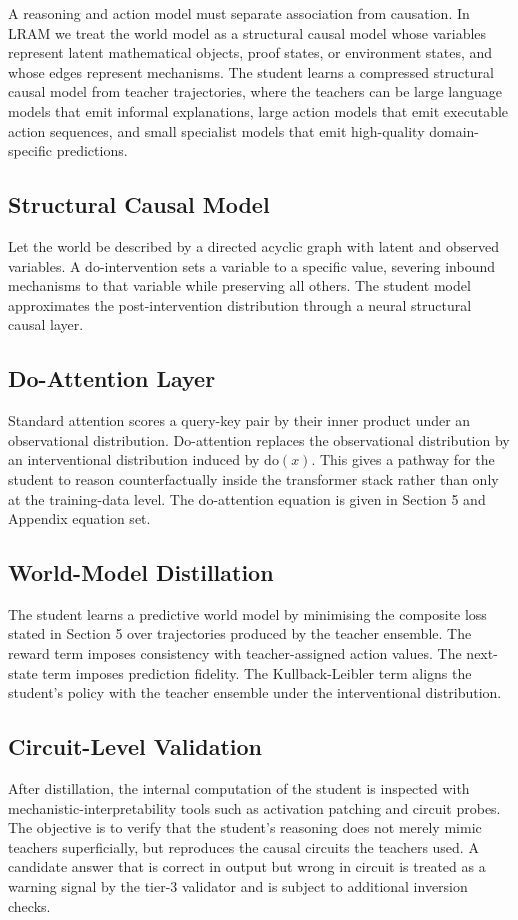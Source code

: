 A reasoning and action model must separate association from causation. In LRAM we treat the world model as a structural causal model whose variables represent latent mathematical objects, proof states, or environment states, and whose edges represent mechanisms. The student learns a compressed structural causal model from teacher trajectories, where the teachers can be large language models that emit informal explanations, large action models that emit executable action sequences, and small specialist models that emit high-quality domain-specific predictions.

\subsection{Structural Causal Model}
Let the world be described by a directed acyclic graph with latent and observed variables. A do-intervention sets a variable to a specific value, severing inbound mechanisms to that variable while preserving all others. The student model approximates the post-intervention distribution through a neural structural causal layer.

\subsection{Do-Attention Layer}
Standard attention scores a query-key pair by their inner product under an observational distribution. Do-attention replaces the observational distribution by an interventional distribution induced by $\mathrm{do}(x)$. This gives a pathway for the student to reason counterfactually inside the transformer stack rather than only at the training-data level. The do-attention equation is given in Section 5 and Appendix equation set.

\subsection{World-Model Distillation}
The student learns a predictive world model by minimising the composite loss stated in Section 5 over trajectories produced by the teacher ensemble. The reward term imposes consistency with teacher-assigned action values. The next-state term imposes prediction fidelity. The Kullback-Leibler term aligns the student's policy with the teacher ensemble under the interventional distribution.

\subsection{Circuit-Level Validation}
After distillation, the internal computation of the student is inspected with mechanistic-interpretability tools such as activation patching and circuit probes. The objective is to verify that the student's reasoning does not merely mimic teachers superficially, but reproduces the causal circuits the teachers used. A candidate answer that is correct in output but wrong in circuit is treated as a warning signal by the tier-3 validator and is subject to additional inversion checks.

